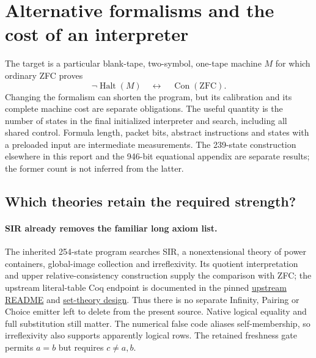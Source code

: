 \section{Alternative formalisms and the cost of an interpreter}
\label{sec:alternative-formalisms}

The target is a particular blank-tape, two-symbol, one-tape machine $M$
for which ordinary ZFC proves
\[
 \neg\operatorname{Halt}(M)\quad\longleftrightarrow\quad
 \operatorname{Con}(\mathrm{ZFC}).
\]
Changing the formalism can shorten the program, but its calibration and its
complete machine cost are separate obligations. The useful quantity is the
number of states in the final initialized interpreter and search, including
all shared control. Formula length, packet bits, abstract instructions and
states with a preloaded input are intermediate measurements. The 239-state
construction elsewhere in this report and the 946-bit equational appendix
are separate results; the former count is not inferred from the latter.

\subsection{Which theories retain the required strength?}

\paragraph{SIR already removes the familiar long axiom list.}
The inherited 254-state program searches SIR, a nonextensional theory of
power containers, global-image collection and irreflexivity. Its quotient
interpretation and upper relative-consistency construction supply the
comparison with ZFC; the upstream literal-table Coq endpoint is documented
in the pinned
\href{https://github.com/jeff87654/busy-beaver/blob/c132d7eae8158cd3a9850ea3eb7251158c3dd821/ZF/m254/README.md}{upstream README}
and
\href{https://github.com/jeff87654/busy-beaver/blob/c132d7eae8158cd3a9850ea3eb7251158c3dd821/ZF/m254/design/settheory.md}{set-theory design}.
Thus there is no separate Infinity, Pairing or Choice emitter left to
delete from the present source. Native logical equality and full
substitution still matter. The numerical false code aliases self-membership,
so irreflexivity also supports apparently logical rows. The retained
freshness gate permits $a=b$ but requires $c\ne a,b$.

